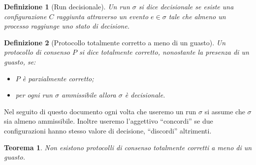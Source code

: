 \documentclass{article}
\newtheorem{definizione}{Definizione}
\newtheorem{teorema}{Teorema}
\begin{document}
\begin{definizione}[Run decisionale]
  Un run $\sigma$ si dice \emph{decisionale} se esiste una
  configurazione $C$ raggiunta attraverso un evento $e\in \sigma$ tale
  che almeno un processo raggiunge uno stato di decisione.
\end{definizione}

\begin{definizione}[Protocollo totalmente corretto a meno di un guasto]
  Un protocollo di consenso $P$ si dice \emph{totalmente corretto},
  nonostante la presenza di un guasto, se:
\begin{itemize}
\item  $P$ è parzialmente corretto;
\item per ogni run $\sigma$ ammissibile allora $\sigma$ \`e decisionale.
\end{itemize}
\end{definizione}

Nel seguito di questo documento ogni volta che useremo un run $\sigma$
si assume che $\sigma$ sia almeno ammissibile. Inoltre useremo
l'aggettivo ``concordi'' se due configurazioni hanno stesso valore di
decisione, ``discordi'' altrimenti.

\begin{teorema}
Non esistono protocolli di consenso totalmente corretti a meno di un guasto.
\end{teorema}
\end{document}
